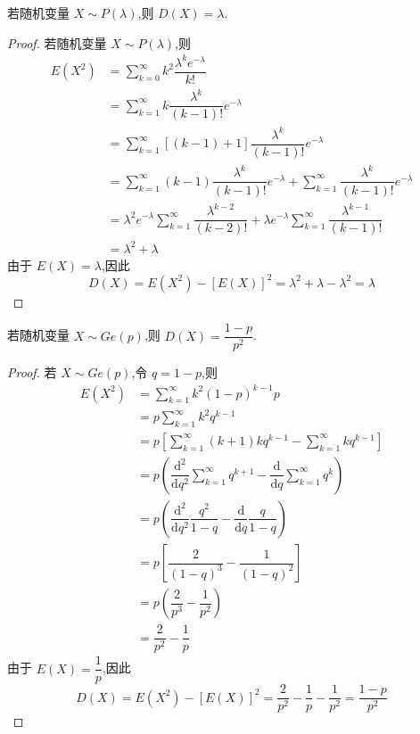 \begin{conclusion}
    \indent 若随机变量 $X \sim P(\lambda)$,则 $D(X) = \lambda$.
\end{conclusion}

\begin{proof}
    若随机变量 $X \sim P(\lambda)$,则
    $$
    \begin{aligned}
        E(X^2) &= \sum_{k=0}^{\infty} k^2 \dfrac{\lambda^k e^{-\lambda}}{k!} \\
        &= \sum_{k=1}^{\infty} k \dfrac{\lambda^{k}}{(k-1)!} e^{-\lambda} \\
        &= \sum_{k=1}^{\infty} [(k-1)+1] \dfrac{\lambda^{k}}{(k-1)!} e^{-\lambda} \\
        &= \sum_{k=1}^{\infty} (k-1) \dfrac{\lambda^{k}}{(k-1)!} e^{-\lambda} + \sum_{k=1}^{\infty} \dfrac{\lambda^{k}}{(k-1)!} e^{-\lambda} \\
        &= \lambda^2 e^{-\lambda} \sum_{k=1}^{\infty} \dfrac{\lambda^{k-2}}{(k-2)!} + \lambda e^{-\lambda} \sum_{k=1}^{\infty} \dfrac{\lambda^{k-1}}{(k-1)!} \\
        &= \lambda^2 + \lambda
    \end{aligned}
    $$
    由于 $E(X) = \lambda$,因此
    $$
    D(X) = E(X^2) - [E(X)]^2 = \lambda^2 + \lambda - \lambda^2 = \lambda
    $$
\end{proof}

\begin{conclusion}
    \indent 若随机变量 $X \sim Ge(p)$,则 $D(X) = \dfrac{1-p}{p^2}$.
\end{conclusion}

\begin{proof}
    若 $X \sim Ge(p)$,令 $q=1-p$,则
    $$
    \begin{aligned}
        E(X^2) &= \sum_{k=1}^{\infty} k^2 (1-p)^{k-1} p \\
        &= p \sum_{k=1}^{\infty} k^2 q^{k-1} \\
        &= p \left[ \sum_{k=1}^{\infty} (k+1)k q^{k-1} - \sum_{k=1}^{\infty} k q^{k-1} \right] \\
        &= p \left( \dfrac{\text{d}^2}{\text{d}q^2} \sum_{k=1}^{\infty} q^{k+1} - \dfrac{\text{d}}{\text{d}q} \sum_{k=1}^{\infty} q^k \right) \\
        &= p \left( \dfrac{\text{d}^2}{\text{d}q^2} \dfrac{q^2}{1-q} - \dfrac{\text{d}}{\text{d}q} \dfrac{q}{1-q} \right) \\
        &= p \left[ \dfrac{2}{(1-q)^3} - \dfrac{1}{(1-q)^2} \right] \\
        &= p \left( \dfrac{2}{p^3} - \dfrac{1}{p^2} \right) \\
        &= \dfrac{2}{p^2} - \dfrac{1}{p}
    \end{aligned}
    $$
    由于 $E(X) = \dfrac{1}{p}$,因此
    $$
    D(X) = E(X^2) - [E(X)]^2 = \dfrac{2}{p^2} - \dfrac{1}{p} - \dfrac{1}{p^2} = \dfrac{1-p}{p^2}
    $$
\end{proof}

